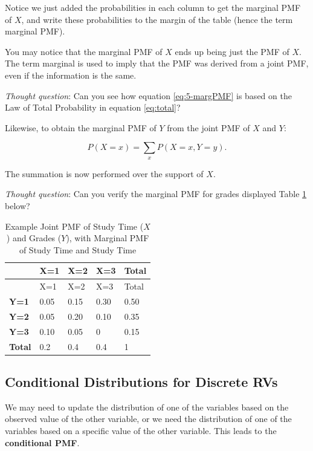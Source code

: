 \documentclass[
]{book}
\begin{document}
Notice we just added the probabilities in each column to get the marginal PMF of \(X\), and write these probabilities to the margin of the table (hence the term marginal PMF).

You may notice that the marginal PMF of \(X\) ends up being just the PMF of \(X\). The term marginal is used to imply that the PMF was derived from a joint PMF, even if the information is the same.

\emph{Thought question}: Can you see how equation \eqref{eq:5-margPMF} is based on the Law of Total Probability in equation \eqref{eq:total}?

Likewise, to obtain the marginal PMF of \(Y\) from the joint PMF of \(X\) and \(Y\):

\begin{equation} 
P(X=x) = \sum_x P(X=x, Y=y).
\label{eq:5-margPMF2}
\end{equation}

The summation is now performed over the support of \(X\).

\emph{Thought question}: Can you verify the marginal PMF for grades displayed Table \ref{tab:5-marg-table2} below?

\begin{longtable}[]{@{}lllll@{}}
\caption{\label{tab:5-marg-table2} Example Joint PMF of Study Time (\(X\)) and Grades (\(Y\)), with Marginal PMF of Study Time and Study Time}\tabularnewline
\toprule\noalign{}
& X=1 & X=2 & X=3 & Total \\
\midrule\noalign{}
\endfirsthead
\toprule\noalign{}
& X=1 & X=2 & X=3 & Total \\
\midrule\noalign{}
\endhead
\bottomrule\noalign{}
\endlastfoot
\textbf{Y=1} & 0.05 & 0.15 & 0.30 & 0.50 \\
\textbf{Y=2} & 0.05 & 0.20 & 0.10 & 0.35 \\
\textbf{Y=3} & 0.10 & 0.05 & 0 & 0.15 \\
\textbf{Total} & 0.2 & 0.4 & 0.4 & 1 \\
\end{longtable}

\subsection{Conditional Distributions for Discrete RVs}\label{conddist}

We may need to update the distribution of one of the variables based on the observed value of the other variable, or we need the distribution of one of the variables based on a specific value of the other variable. This leads to the \textbf{conditional PMF}.
\end{document}
